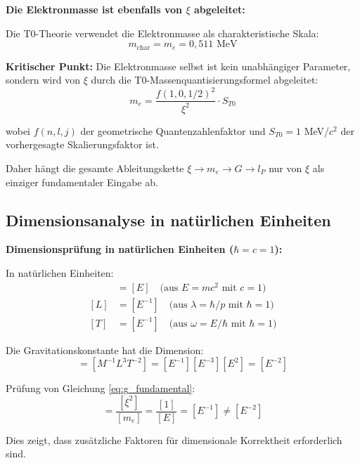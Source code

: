 \documentclass[12pt,a4paper]{article}
\begin{document}
	\begin{insight}
		\textbf{Die Elektronmasse ist ebenfalls von $\xi$ abgeleitet:}
		
		Die T0-Theorie verwendet die Elektronmasse als charakteristische Skala:
		\begin{equation}
			m_{\text{char}} = m_e = 0{,}511 \text{ MeV}
			\label{eq:characteristic_mass}
		\end{equation}
		
		\textbf{Kritischer Punkt:} Die Elektronmasse selbst ist kein unabh{\"a}ngiger Parameter, sondern wird von $\xi$ durch die T0-Massenquantisierungsformel abgeleitet:
		\begin{equation}
			m_e = \frac{f(1,0,1/2)^2}{\xi^2} \cdot S_{T0}
		\end{equation}
		
		wobei $f(n,l,j)$ der geometrische Quantenzahlenfaktor und $S_{T0} = 1$ MeV/$c^2$ der vorhergesagte Skalierungsfaktor ist.
		
		Daher h{\"a}ngt die gesamte Ableitungskette $\xi \to m_e \to G \to l_P$ nur von $\xi$ als einziger fundamentaler Eingabe ab.
	\end{insight}
	
	\subsection{Dimensionsanalyse in nat{\"u}rlichen Einheiten}
	
	\begin{derivation}
		\textbf{Dimensionspr{\"u}fung in nat{\"u}rlichen Einheiten ($\hbar = c = 1$):}
		
		In nat{\"u}rlichen Einheiten:
		\begin{align}
			[M] &= [E] \quad \text{(aus } E = mc^2 \text{ mit } c = 1\text{)} \\
			[L] &= [E^{-1}] \quad \text{(aus } \lambda = \hbar/p \text{ mit } \hbar = 1\text{)} \\
			[T] &= [E^{-1}] \quad \text{(aus } \omega = E/\hbar \text{ mit } \hbar = 1\text{)}
		\end{align}
		
		Die Gravitationskonstante hat die Dimension:
		\begin{equation}
			[G] = [M^{-1}L^3T^{-2}] = [E^{-1}][E^{-3}][E^2] = [E^{-2}]
		\end{equation}
		
		Pr{\"u}fung von Gleichung \eqref{eq:g_fundamental}:
		\begin{equation}
			[G] = \frac{[\xi^2]}{[m_e]} = \frac{[1]}{[E]} = [E^{-1}] \neq [E^{-2}]
		\end{equation}
		
		Dies zeigt, dass zus{\"a}tzliche Faktoren f{\"u}r dimensionale Korrektheit erforderlich sind.
	\end{derivation}
	
\end{document}
